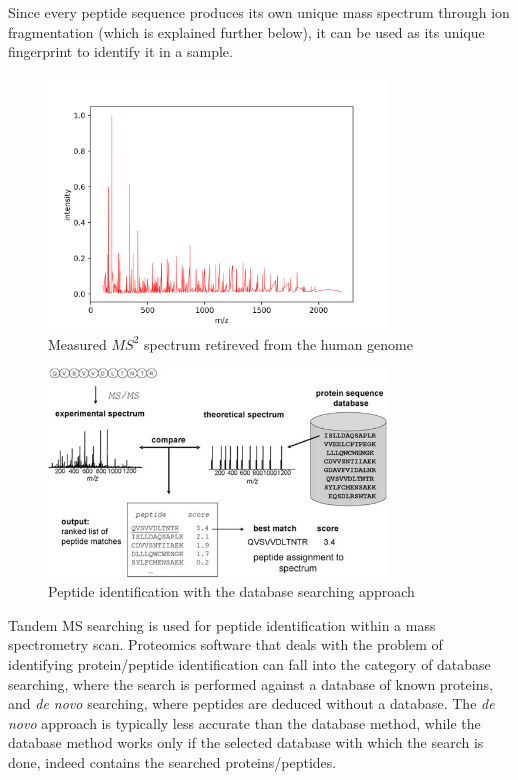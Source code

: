 \documentclass[11pt]{article}
\begin{document}
Since every peptide sequence produces its own unique mass spectrum through ion fragmentation (which is explained further below), it can be used as its unique fingerprint to identify it in a sample. 
\begin{figure}[ht]
\centering
\includegraphics[width=0.8\textwidth]{figs/peptide.png}
\caption{Measured \(MS^2\) spectrum retireved from the human genome}
\label{fig:peptide-example}
\end{figure}
\begin{figure}[ht]
\centering
\includegraphics[width=0.8\textwidth]{figs/database_search.jpg}
\caption{Peptide identification with the database searching approach \cite{Nesvizhskii2007}}
\label{fig:database-search}
\end{figure}
Tandem MS searching is used for peptide identification within a mass spectrometry scan. Proteomics software that deals with the problem of identifying protein/peptide identification can fall into the category of database searching, where the search is performed against a database of known proteins, and \textit{de novo} searching, where peptides are deduced without a database. The \textit{de novo} approach is typically less accurate than the database method, while the database method works only if the selected database with which the search is done, indeed contains the searched proteins/peptides.
\end{document}
